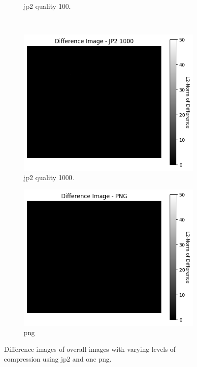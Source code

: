 \begin{figure}[htb]
\begin{subfigure}[b]{0.49\textwidth}
            \caption{\gls{jp2} quality 100.}
            \label{fig:img_quality_heatmap_100}
        \end{subfigure}
        \\
        \begin{subfigure}[b]{0.49\textwidth}
            \centering
            \includegraphics[width=\textwidth]{doc/thesis/0_figures/compare_quality/set1/jp2_1000_diff_heatmap.png}
            \caption{\gls{jp2} quality 1000.}
            \label{fig:img_quality_heatmap_1000}
        \end{subfigure}
        \begin{subfigure}[b]{0.49\textwidth}
            \centering
            \includegraphics[width=\textwidth]{doc/thesis/0_figures/compare_quality/set1/png_diff_heatmap.png}
            \caption{\gls{png}}
            \label{fig:img_quality_heatmap_png}
        \end{subfigure}
    \caption{Difference images of overall images with varying levels of compression using \gls{jp2} and one \gls{png}.}
    \label{fig:img_quality_heatmap}
\end{figure}

